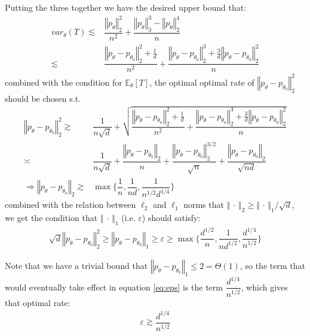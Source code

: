 \documentclass[twoside,12pt]{article}
\begin{document}
Putting the three together we have the desired upper bound that:
\begin{align*}
    var_\theta (T)\lesssim & \dfrac{ \left\Vert p_\theta  \right\Vert _2^2  }{ n^2 } + \dfrac{ \left\Vert p_\theta  \right\Vert _3^3 - \left\Vert p_\theta  \right\Vert _2^4 }{ n }\\
    \lesssim & \dfrac{ \left\Vert p_\theta -p_{\theta _0} \right\Vert _2^2 +\frac{1}{d} }{ n^2 } + \dfrac{ \left\Vert p_\theta- p_{\theta _0} \right\Vert _2^3 + \frac{3}{d}\left\Vert p_\theta -p_{\theta _0} \right\Vert _2^2 }{ n }  
\end{align*}
combined with the condition for $ \mathbb{E}_\theta \left[ T \right]  $, the optimal optimal rate of $ \left\Vert p_\theta -p_{\theta _0} \right\Vert _2^2 $ should be chosen s.t.
\begin{align*}
   \left\Vert p_\theta -p_{\theta _0} \right\Vert _2^2 \gtrsim &\dfrac{ 1 }{ n\sqrt{d} }+ \sqrt{ \dfrac{ \left\Vert p_\theta -p_{\theta _0} \right\Vert _2^2 +\frac{1}{d} }{ n^2 } + \dfrac{ \left\Vert p_\theta- p_{\theta _0} \right\Vert _2^3 + \frac{3}{d}\left\Vert p_\theta -p_{\theta _0} \right\Vert _2^2 }{ n }  } \\
   \asymp& \dfrac{ 1 }{ n\sqrt{d} } + \dfrac{ \left\Vert p_\theta -p_{\theta _0} \right\Vert _2 }{ n } + \dfrac{ \left\Vert p_\theta -p_{\theta _0} \right\Vert _2^{3/2} }{ \sqrt{n} } + \dfrac{ \left\Vert p_\theta -p_{\theta _0} \right\Vert _2 }{ \sqrt{nd} }   \\
    \Rightarrow \left\Vert p_\theta -p_{\theta _0} \right\Vert _2 \gtrsim & \max \big\{  \dfrac{ 1 }{ n } , \dfrac{ 1 }{ nd } , \dfrac{ 1 }{ n^{1/2}d^{1/4} }     \big\}
\end{align*}
combined with the relation between $ \ell_2 $ and $ \ell_1 $ norms that $ \left\Vert \, \cdot \,  \right\Vert _2 \geq \left\Vert \, \cdot \,  \right\Vert _1/\sqrt{d} $, we get the condition that $ \left\Vert \, \cdot \,  \right\Vert _1 $ (i.e. $ \varepsilon  $) should satisfy:
\begin{align}\label{eq:eps}
   \sqrt{d}\left\Vert p_\theta - p_{\theta _0} \right\Vert _2^2 \geq \left\Vert p_\theta - p_{\theta _0} \right\Vert _1 \geq \varepsilon \geq \max\big\{ \dfrac{ d^{1/2} }{ n }, \dfrac{ 1 }{ nd^{1/2} }, \dfrac{ d^{1/4} }{ n^{1/2} } \big\}   
\end{align}

Note that we have a trivial bound that $ \left\Vert p_\theta -p_{\theta _0} \right\Vert _1 \leq 2 = \Theta (1)  $, so the term that would eventually take effect in equation \ref{eq:eps} is the term $ \dfrac{ d^{1/4} }{ n^{1/2} }$, which gives that optimal rate:
\begin{align*}
   \varepsilon \gtrsim \dfrac{ d^{1/4} }{ n^{1/2} } 
\end{align*}
\end{document}
